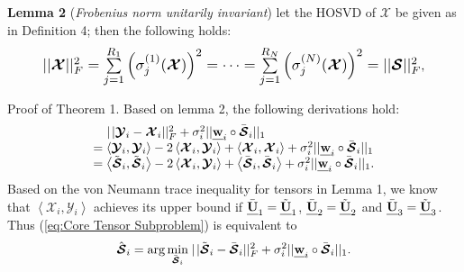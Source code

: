 \documentclass[twocolumn]{svjour3}          %
\begin{document}
    \noindent
    \textbf{Lemma 2} (\emph{Frobenius norm unitarily invariant}) \cite{Lathauwer2000A} let the HOSVD of ${\boldsymbol{\mathcal{X}}}$ be given as in Definition 4; then the following holds:
    \begin{equation}\label{eq:Frobenius norm unitarily invariant}
    \begin{aligned}
    \setlength{\abovedisplayskip}{2pt}
    \setlength{\belowdisplayskip}{2pt}
    \resizebox{0.87\hsize}{!}{$||{\boldsymbol{\mathcal{X}}}||_F^2 = \sum\limits_{j = 1}^{{R_1}} {{{\left( {\sigma _j^{(1)}({\boldsymbol{\mathcal{X}}})} \right)}^2}}  =  \cdots  = \sum\limits_{j = 1}^{{R_N}} {{{\left( {\sigma _j^{(N)}({\boldsymbol{\mathcal{X}}})} \right)}^2}}  = ||{\boldsymbol{\mathcal{S}}}||_F^2$},
    \end{aligned}
    \end{equation}

    Proof of Theorem 1. Based on lemma 2, the following derivations hold:
    $$\begin{array}{l}
    {\kern 1pt} {\kern 1pt} {\kern 1pt} {\kern 1pt} {\kern 1pt} {\kern 1pt} {\kern 1pt} {\kern 1pt} {\kern 1pt} {\kern 1pt} {\kern 1pt} |{\kern 1pt} |{{\boldsymbol{\mathcal{Y}}}_i} - {{\boldsymbol{\mathcal{X}}}_i}||_F^2 + \sigma _i^2||{\textbf{\emph{w}}_i} \circ {{\bar{\boldsymbol{\mathcal{S}}}}_i}|{|_1}\\
    = \left\langle {{{\boldsymbol{\mathcal{Y}}}_i},{{\boldsymbol{\mathcal{Y}}}_i}} \right\rangle  - 2\left\langle {{{\boldsymbol{\mathcal{X}}}_i},{{\boldsymbol{\mathcal{Y}}}_i}} \right\rangle  + \left\langle {{{\boldsymbol{\mathcal{X}}}_i},{{\boldsymbol{\mathcal{X}}}_i}} \right\rangle  + \sigma _i^2||{\textbf{\emph{w}}_i} \circ {{\bar{\boldsymbol{\mathcal{S}}}}_i}|{|_1}\\
    = \left\langle {{{\tilde{\boldsymbol{\mathcal{S}}}}_i},{{\tilde{\boldsymbol{\mathcal{S}}}}_i}} \right\rangle - 2\left\langle {{{\boldsymbol{\mathcal{X}}}_i},{{\boldsymbol{\mathcal{Y}}}_i}} \right\rangle  + \left\langle {{{\bar{\boldsymbol{\mathcal{S}}}}_i},{{\bar{\boldsymbol{\mathcal{S}}}}_i}} \right\rangle  + \sigma _i^2||{\textbf{\emph{w}}_i} \circ {{\bar{\boldsymbol{\mathcal{S}}}}_i}|{|_1}.
    \end{array}$$
    Based on the von Neumann trace inequality for tensors in Lemma 1, we know that $\left\langle {{{\boldsymbol{\mathcal{X}}}_i},{{\boldsymbol{\mathcal{Y}}}_i}} \right\rangle$ achieves its upper bound if  ${\bar{\textbf{\emph{U}}}_1} = {\tilde{\textbf{\emph{U}}}_1}$, ${\bar{\textbf{\emph{U}}}_2} = {\tilde{\textbf{\emph{U}}}_2}$ and ${\bar{\textbf{\emph{U}}}_3} = {\tilde{\textbf{\emph{U}}}_3}$. Thus (\ref{eq:Core Tensor Subproblem}) is equivalent to
    \begin{equation}\label{eq:Convex Problem}
    \begin{aligned}
    {{{\hat{\boldsymbol{\mathcal{S}}}}_i}}= \arg \mathop {\min }\limits_{{{\bar{\boldsymbol{\mathcal{S}}}}_i}} {\kern 1pt} |{\kern 1pt} |{\tilde{\boldsymbol{\mathcal{S}}}_i} - {\bar{\boldsymbol{\mathcal{S}}}_i}||_F^2 + \sigma _i^2||{\textbf{\emph{w}}_i} \circ {\bar{\boldsymbol{\mathcal{S}}}_i}|{|_1}.
    \end{aligned}
    \end{equation}
\end{document}
